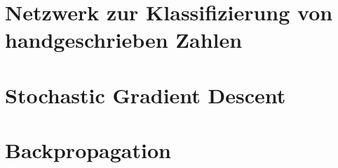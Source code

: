 \section{Netzwerk zur Klassifizierung von handgeschrieben Zahlen}

\section{Stochastic Gradient Descent}

\section{Backpropagation}